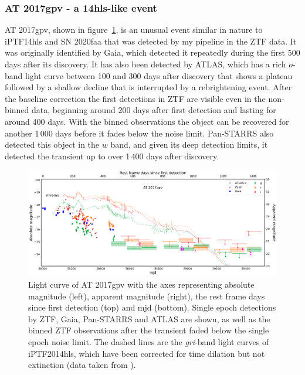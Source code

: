 \documentclass[a4paper,oneside,12pt, class=Latex/Classes/PhDthesisPSnPDF, crop=false]{standalone}
\begin{document}
\subsubsection{AT 2017gpv - a 14hls-like event}

AT 2017gpv, shown in figure~\ref{17gpv_plot}, is an unusual event similar in nature to iPTF14hls \citep{iPTF14hls_Iair, Sollerman_2019_iptf14hls} and SN 2020faa \citep{Yang_2021_20faa, 2020faa_hidden_shocks} that was detected by my pipeline in the ZTF data. It was originally identified by Gaia, which detected it repeatedly during the first 500 days after its discovery. It has also been detected by ATLAS, which has a rich $o$-band light curve between 100 and 300 days after discovery that shows a plateau followed by a shallow decline that is interrupted by a rebrightening event. After the baseline correction the first detections in ZTF are visible even in the non-binned data, beginning around 200 days after first detection and lasting for around 400 days. With the binned observations the object can be recovered for another 1\,000 days before it fades below the noise limit. Pan-STARRS also detected this object in the $w$ band, and given its deep detection limits, it detected the transient up to over 1\,400 days after discovery.

\begin{figure}
    \centering
    \includegraphics[width=\textwidth]{../Images/chapter_4/17gpv.png}
    \caption[pre-ZTF and ZTF light curve of AT 2017gpv.]{Light curve of AT 2017gpv with the axes representing absolute magnitude (left), apparent magnitude (right), the rest frame days since first detection (top) and mjd (bottom). Single epoch detections by ZTF, Gaia, Pan-STARRS and ATLAS are shown, as well as the binned ZTF observations after the transient faded below the single epoch noise limit. The dashed lines are the \textit{gri}-band light curves of iPTF2014hls, which have been corrected for time dilation but not extinction (data taken from \citealt{iPTF14hls_Iair, Sollerman_2019_iptf14hls}).}
    \label{17gpv_plot}
\end{figure}
\end{document}
